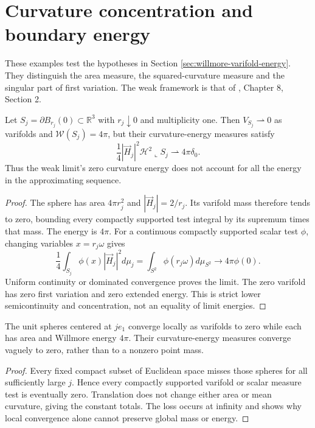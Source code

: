 \chapter{Curvature concentration and boundary energy}\label{sec:examples-willmore-weak-limits}
These examples test the hypotheses in Section \ref{sec:willmore-varifold-energy}. They distinguish the area measure, the squared-curvature measure and the singular part of first variation. The weak framework is that of \cite{Sim18}, Chapter 8, Section 2.

\begin{example}\label{ex:collapsing-sphere-willmore-defect}
Let $S_j=\partial B_{r_j}(0)\subset\mathbb R^3$ with $r_j\downarrow0$ and multiplicity one. Then $V_{S_j}\rightharpoonup0$ as varifolds and $\mathcal W(S_j)=4\pi$, but their curvature-energy measures satisfy
\[
 \frac14|\vec H_j|^2\mathcal H^2\llcorner S_j\rightharpoonup4\pi\delta_0.
\]
Thus the weak limit's zero curvature energy does not account for all the energy in the approximating sequence.
\end{example}
\begin{proof}
The sphere has area $4\pi r_j^2$ and $|\vec H_j|=2/r_j$. Its varifold mass therefore tends to zero, bounding every compactly supported test integral by its supremum times that mass. The energy is $4\pi$. For a continuous compactly supported scalar test $\phi$, changing variables $x=r_j\omega$ gives
\[
 \frac14\int_{S_j}\phi(x)|\vec H_j|^2d\mu_j
 =\int_{S^2}\phi(r_j\omega)d\mu_{S^2}\longrightarrow4\pi\phi(0).
\]
Uniform continuity or dominated convergence proves the limit. The zero varifold has zero first variation and zero extended energy. This is strict lower semicontinuity and concentration, not an equality of limit energies.
\end{proof}

\begin{example}\label{ex:willmore-spheres-escape}
The unit spheres centered at $je_1$ converge locally as varifolds to zero while each has area and Willmore energy $4\pi$. Their curvature-energy measures converge vaguely to zero, rather than to a nonzero point mass.
\end{example}
\begin{proof}
Every fixed compact subset of Euclidean space misses those spheres for all sufficiently large $j$. Hence every compactly supported varifold or scalar measure test is eventually zero. Translation does not change either area or mean curvature, giving the constant totals. The loss occurs at infinity and shows why local convergence alone cannot preserve global mass or energy.
\end{proof}

